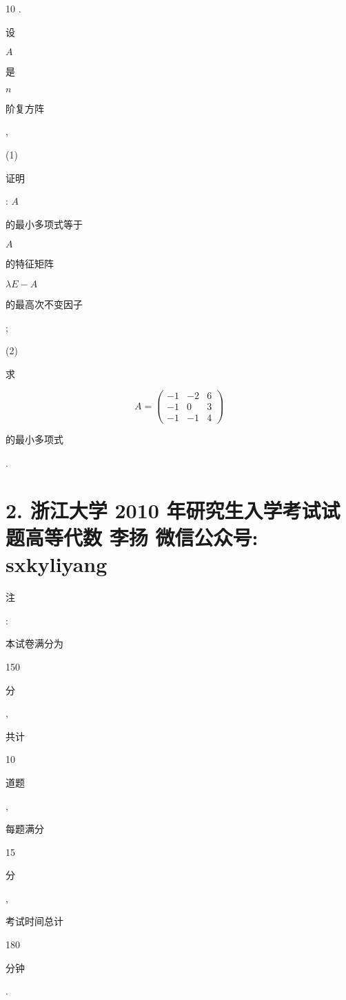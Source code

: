 \documentclass[10pt]{article}
\begin{document}
10 . \begin{CJK}{UTF8}{mj}设\end{CJK} $A$ \begin{CJK}{UTF8}{mj}是\end{CJK} $n$ \begin{CJK}{UTF8}{mj}阶复方阵\end{CJK},

(1) \begin{CJK}{UTF8}{mj}证明\end{CJK}: $A$ \begin{CJK}{UTF8}{mj}的最小多项式等于\end{CJK} $A$ \begin{CJK}{UTF8}{mj}的特征矩阵\end{CJK} $\lambda E-A$ \begin{CJK}{UTF8}{mj}的最高次不变因子\end{CJK};

(2) \begin{CJK}{UTF8}{mj}求\end{CJK}
$$
A=\left(\begin{array}{ccc}
-1 & -2 & 6 \\
-1 & 0 & 3 \\
-1 & -1 & 4
\end{array}\right)
$$
\begin{CJK}{UTF8}{mj}的最小多项式\end{CJK}.

\section{2. 浙江大学 2010 年研究生入学考试试题高等代数 
 李扬 
 微信公众号: sxkyliyang}
\begin{CJK}{UTF8}{mj}注\end{CJK}: \begin{CJK}{UTF8}{mj}本试卷满分为\end{CJK} 150 \begin{CJK}{UTF8}{mj}分\end{CJK}, \begin{CJK}{UTF8}{mj}共计\end{CJK} 10 \begin{CJK}{UTF8}{mj}道题\end{CJK}, \begin{CJK}{UTF8}{mj}每题满分\end{CJK} 15 \begin{CJK}{UTF8}{mj}分\end{CJK}, \begin{CJK}{UTF8}{mj}考试时间总计\end{CJK} 180 \begin{CJK}{UTF8}{mj}分钟\end{CJK}.
\end{document}
